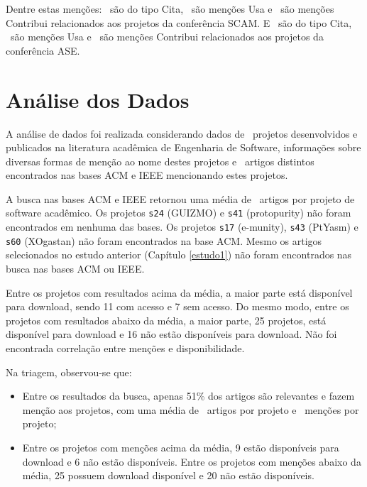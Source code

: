 Dentre estas menções: \CiteSCAMCount \ são do tipo Cita,
\UseSCAMCount \ são menções Usa e
\ContributeSCAMCount \ são menções Contribui relacionados aos projetos da conferência SCAM.
E \CiteASECount \ são do tipo Cita,
\UseASECount \ são menções Usa e
\ContributeASECount \ são menções Contribui relacionados aos projetos da conferência ASE.




\section{Análise dos Dados} \label{estudo2:analise} %

A análise de dados foi realizada considerando
dados de \SoftwareCount \ projetos desenvolvidos e publicados na literatura
acadêmica de Engenharia de Software, informações sobre diversas formas de
menção ao nome destes projetos e \ScreeningUniqueCount \ artigos distintos
encontrados nas bases ACM e IEEE mencionando estes projetos.

A busca nas bases ACM e IEEE retornou uma média de \SearchUniqueMean \ artigos
por projeto de software acadêmico. 
Os projetos \texttt{s24} (GUIZMO) e \texttt{s41} (protopurity)
não foram encontrados em nenhuma das bases.
Os projetos \texttt{s17} (e-munity), \texttt{s43} (PtYasm) e \texttt{s60} (XOgastan)
não foram encontrados na base ACM.
Mesmo os artigos selecionados no estudo anterior (Capítulo \ref{estudo1}) não
foram encontrados nas busca nas bases ACM ou IEEE.

Entre os projetos com resultados acima da média, 
a maior parte está disponível para download, 
sendo 11 com acesso e 7 sem acesso.  
Do mesmo modo, entre os projetos com resultados abaixo da média, 
a maior parte, 25 projetos, está disponível para download
e 16 não estão disponíveis para download.
Não foi encontrada correlação entre menções e disponibilidade.

Na triagem, observou-se que:

\begin{itemize}
  \item Entre os resultados da busca, apenas 51\% dos artigos são relevantes e
    fazem menção aos projetos, com uma média de \ScreeningUniqueMean \ artigos
    por projeto e \ScreeningMean \ menções por projeto;
  \item Entre os projetos com menções acima da média, 9 estão disponíveis para
    download e 6 não estão disponíveis. Entre os projetos com menções abaixo da
    média, 25 possuem download disponível e 20 não estão disponíveis.
\end{itemize}


